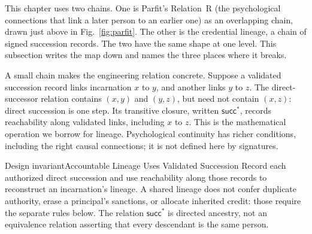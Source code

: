 \documentclass[11pt,a4paper]{article}
\theoremstyle{definition}
\begin{document}
This chapter uses two chains. One is Parfit's Relation~R (the psychological
connections that link a later person to an earlier one) as an overlapping
chain, drawn just above in Fig.~\ref{fig:parfit}. The other is the credential
lineage, a chain of signed succession records. The two have the same shape at
one level. This subsection writes the map down and names the three places
where it breaks.

%
A small chain makes the engineering relation concrete. Suppose a validated succession record links incarnation $x$ to $y$, and another links $y$ to $z$. The direct-successor relation contains $(x,y)$ and $(y,z)$, but need not contain $(x,z)$: direct succession is one step. Its transitive closure, written $\mathsf{succ}^{*}$, records reachability along validated links, including $x$ to $z$. This is the mathematical operation we borrow for lineage. Psychological continuity has richer conditions, including the right causal connections; it is not defined here by signatures.

\begin{pdclaim}{Design invariant}{Accountable Lineage Uses Validated Succession}
\label{inv:parfit-lineage}
Record each authorized direct succession and use reachability along those records to reconstruct an incarnation's lineage. A shared lineage does not confer duplicate authority, erase a principal's sanctions, or allocate inherited credit: those require the separate rules below. The relation $\mathsf{succ}^{*}$ is directed ancestry, not an equivalence relation asserting that every descendant is the same person.
\end{pdclaim}
\end{document}

